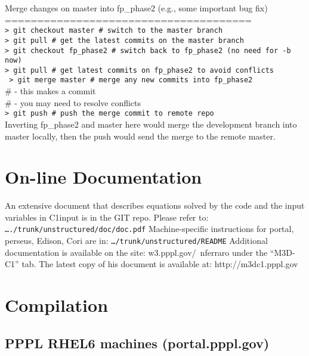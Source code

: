 Merge changes on master into fp\_phase2 (e.g., some important bug fix)
\\
======================================
\\
\texttt{> git checkout master    \# switch to the master branch
}
\\
\texttt{> git pull               \# get the latest commits on the master branch
}
\\
\texttt{> git checkout fp\_phase2 \# switch back to fp\_phase2 (no need for -b now)
}
\\
\texttt{> git pull               \# get latest commits on fp\_phase2 to avoid conflicts
}
\\
\texttt{
> git merge master       \# merge any new commits into fp\_phase2
}
\\
                         \#  - this makes a commit
\\
                         \#  - you may need to resolve conflicts
\\
\texttt{> git push               \# push the merge commit to remote repo
}
\\

Inverting fp\_phase2 and master here would merge the development branch into master locally, then the push would send the merge to the remote master.

\section{On-line Documentation}
An extensive document that describes equations solved by the code and the input variables in C1input is in the GIT repo. Please refer to:
\\
\texttt{…./trunk/unstructured/doc/doc.pdf}
\newline\newline
Machine-specific instructions for portal, perseus, Edison, Cori are in:  
\texttt{…/trunk/unstructured/README}
\newline\newline
Additional documentation is available on the site:  w3.pppl.gov/~nferraro under the “M3D-C1” tab.
\newline\newline
The latest copy of his document is available at: http://m3dc1.pppl.gov

\section{Compilation}
\subsection{PPPL RHEL6 machines (portal.pppl.gov)}
